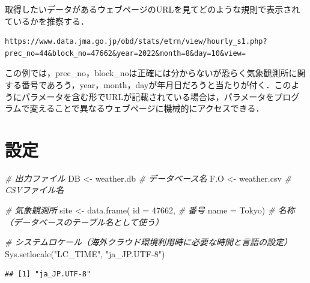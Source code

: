 \documentclass[
]{article}
\newenvironment{Shaded}{\begin{snugshade}}{\end{snugshade}}
\newcommand{\AttributeTok}[1]{\textcolor[rgb]{0.77,0.63,0.00}{#1}}
\newcommand{\CommentTok}[1]{\textcolor[rgb]{0.56,0.35,0.01}{\textit{#1}}}
\newcommand{\DecValTok}[1]{\textcolor[rgb]{0.00,0.00,0.81}{#1}}
\newcommand{\FunctionTok}[1]{\textcolor[rgb]{0.00,0.00,0.00}{#1}}
\newcommand{\NormalTok}[1]{#1}
\newcommand{\OtherTok}[1]{\textcolor[rgb]{0.56,0.35,0.01}{#1}}
\newcommand{\SpecialCharTok}[1]{\textcolor[rgb]{0.00,0.00,0.00}{#1}}
\newcommand{\StringTok}[1]{\textcolor[rgb]{0.31,0.60,0.02}{#1}}
\begin{document}
取得したいデータがあるウェブページのURLを見てどのような規則で表示されているかを推察する．

\begin{verbatim}
https://www.data.jma.go.jp/obd/stats/etrn/view/hourly_s1.php?prec_no=44&block_no=47662&year=2022&month=8&day=10&view=  
\end{verbatim}

この例では，prec\_no，block\_noは正確には分からないが恐らく気象観測所に関する番号であろう，year，month，dayが年月日だろうと当たりが付く．このようにパラメータを含む形でURLが記載されている場合は，パラメータをプログラムで変えることで異なるウェブページに機械的にアクセスできる．

\hypertarget{ux8a2dux5b9a}{%
\section{設定}\label{ux8a2dux5b9a}}

\begin{Shaded}
\begin{Highlighting}[]
\CommentTok{\# 出力ファイル}
\NormalTok{DB  }\OtherTok{\textless{}{-}} \StringTok{\textquotesingle{}weather.db\textquotesingle{}}  \CommentTok{\# データベース名}
\NormalTok{F.O }\OtherTok{\textless{}{-}} \StringTok{\textquotesingle{}weather.csv\textquotesingle{}} \CommentTok{\# CSVファイル名}

\CommentTok{\# 気象観測所}
\NormalTok{site }\OtherTok{\textless{}{-}} \FunctionTok{data.frame}\NormalTok{(}
  \AttributeTok{id   =} \DecValTok{47662}\NormalTok{,   }\CommentTok{\# 番号}
  \AttributeTok{name =} \StringTok{\textquotesingle{}Tokyo\textquotesingle{}}\NormalTok{) }\CommentTok{\# 名称（データベースのテーブル名として使う）}

\CommentTok{\# システムロケール（海外クラウド環境利用時に必要な時間と言語の設定）}
\FunctionTok{Sys.setlocale}\NormalTok{(}\StringTok{"LC\_TIME"}\NormalTok{, }\StringTok{"ja\_JP.UTF{-}8"}\NormalTok{)}
\end{Highlighting}
\end{Shaded}

\begin{verbatim}
## [1] "ja_JP.UTF-8"
\end{verbatim}

\begin{Shaded}
\end{Shaded}
\end{document}
